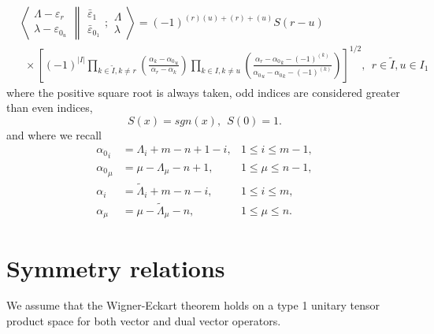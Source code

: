 \documentclass[12pt]{article}
\def\nn{\nonumber}
\begin{document}
\begin{align}
&\left\langle 
\begin{array}{c} \Lambda-\varepsilon_r\\ \lambda-\varepsilon_{0_u} 
 \end{array}
\right\rVert
\left.
\begin{array}{c} \bar{\varepsilon}_1 \\ \bar{\varepsilon}_{0_1} 
 \end{array}
; \begin{array}{c} \Lambda \\ \lambda
 \end{array}
\right\rangle = (-1)^{(r)(u) +(r) + (u)} S(r-u) 
\nn\\
&~~\times
\left[
 (-1)^{|I|} \prod_{k\in \tilde{I},k\neq r} 
\left(
\frac 
{\alpha_k - {\alpha_0}_u  }
{\alpha_r - \alpha_k }
\right)
\prod_{k\in I,k \neq u} 
\left(
\frac
{ \alpha_r - {\alpha_0}_k - (-1)^{(k)} }
{{\alpha_0}_u - {\alpha_0}_k - (-1)^{(k)} }
\right)
\right]^{1/2}
,\ \ r\in \tilde{I},u\in I_1  \label{FinalUnBarredOdd}
\end{align}
where the positive square root is always taken, odd indices are considered greater than even indices, 
$$
S(x) = sgn(x),~~S(0)=1.
$$
and where we recall
\begin{align*}
{\alpha_0}_i &= \Lambda_i + m - n + 1 - i  , &1\leq i\leq m-1, \\
{\alpha_0}_\mu &= \mu - \Lambda_\mu -n + 1, &1\leq \mu \leq n-1 , \\
\alpha_i &= {\tilde{\Lambda}}_i + m - n - i, &1\leq i\leq m, \\
\alpha_\mu &= \mu-{\tilde{\Lambda}}_\mu - n, &1\leq \mu \leq n .  
\end{align*}


\section{Symmetry relations}

We assume that the Wigner-Eckart theorem holds on a type 1 unitary tensor product space for both vector and dual vector operators.
\end{document}
